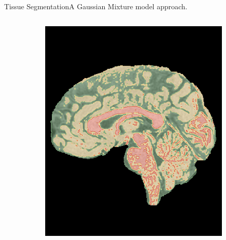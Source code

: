 \documentclass[]{standalone}
\begin{document}
\begin{frame}{Tissue Segmentation}{A Gaussian Mixture model approach.}
\begin{columns}
\begin{column}{0.7\textwidth}
\begin{figure}[h!]
\begin{subfigure}{0.45\textwidth}
					\includegraphics[scale=0.112]{./IMG/segmented_lateral.png}
				\end{subfigure}
				\hfill
			\end{figure}
			\end{column}
		\end{columns}
	\end{frame}
\end{document}

